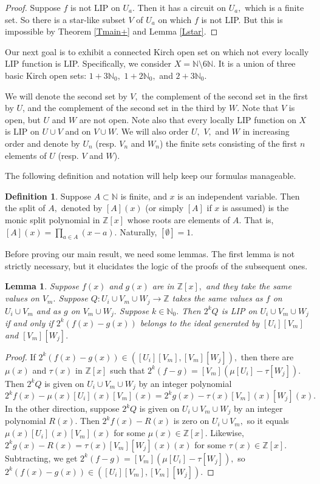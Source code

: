 \documentclass[10pt]{article}
\newtheorem{lemma}[theorem]{Lemma}
\theoremstyle{definition}
\newtheorem{definition}{Definition}
\begin{document}
\begin{proof} Suppose $f$ is not LIP on $U_a.$ Then it has a circuit on $U_a,$ which is a finite set. So there is a star-like subset $V$ of $U_a$ on which $f$ is not LIP. But this is impossible by Theorem \ref{Tmain+} and Lemma \ref{Lstar}.
\end{proof}

Our next goal is to exhibit a connected Kirch open set on which not every locally LIP function is LIP. Specifically, we consider $X=\mathbb N \setminus 6\mathbb N.$ It is a union of three basic Kirch open sets: $1+3\mathbb N_0,$   $1+2\mathbb N_0,$ and  $2+3\mathbb N_0.$ 

We will denote the second set by $V, $ the complement of the second set in the first by $U$, and  the complement of the second set in the third by $W$. Note that $V$ is open, but $U$ and $W$ are not open. Note also that every locally LIP function on $X$ is LIP on $U\cup V$ and on $V \cup W.$ We will also order $U,$ $V,$ and $W$ in increasing order and denote by $U_n$ (resp. $V_n$ and $W_n$) the finite sets consisting of the first $n$ elements of $U$ (resp. $V$ and $W$).


The following definition and notation will help keep our formulas manageable.
\begin{definition} Suppose $A\subset \mathbb N$ is finite, and $x$ is an independent variable. Then the split of $A,$ denoted by $[A](x)$ (or simply $[A]$ if $x$ is assumed) is the monic split polynomial in $\mathbb Z[x]$ whose roots are elements of $A$. That is, $[A](x)= \prod \limits_{a\in A} (x-a).$  Naturally, $[\emptyset]=1.$
\end{definition}

Before proving our main result, we need some lemmas. The first lemma is not strictly necessary, but it elucidates the logic of the proofs of the subsequent ones.

\begin{lemma} Suppose $f(x)$ and $g(x)$ are in $\mathbb Z[x],$ and they take the same values on $V_m.$ Suppose $Q: U_i\cup V_m \cup W_j \to \mathbb Z$ takes the same values as $f$ on $U_i \cup V_m$ and as $g$ on $V_m\cup W_j.$ Suppose $k\in \mathbb N_0.$ Then  $2^k Q$ is LIP on $U_i\cup V_m \cup W_j$ if and only if $2^k(f(x)-g(x))$ belongs to the ideal generated by $[U_i][V_m]$ and $[V_m][W_j].$
\end{lemma}

\begin{proof}  If $2^k(f(x)-g(x))\in ([U_i][V_m],[V_m][W_j]),$ then there are $\mu(x)$ and $\tau(x)$ in $\mathbb Z[x]$ such that $2^k(f-g)=[V_m](\mu [U_i]-\tau [W_j]).$ Then $2^kQ$ is given on $U_i\cup V_m \cup W_j$ by an integer polynomial 
$$2^k f(x)-\mu(x)[U_i](x)[V_m](x) =  2^k  g(x)-\tau(x)[V_m](x)[W_j](x). $$
In the other direction, suppose $2^kQ$ is given on $U_i\cup V_m \cup W_j$ by an integer polynomial $R(x).$ Then $2^kf(x)-R(x)$ is zero on $U_i\cup V_m,$ so it equals $\mu(x)[U_i](x)[V_m](x)$ for some $\mu(x)\in \mathbb Z[x].$  Likewise, $2^kg(x)-R(x)=\tau(x)[V_m][W_j](x)(x)$ for some $\tau(x)\in \mathbb Z[x].$ Subtracting, we get $2^k(f-g)=[V_m](\mu [U_i]-\tau [W_j]),$ so $2^k(f(x)-g(x))\in ([U_i][V_m],[V_m][W_j]).$
\end{proof}
\end{document}
